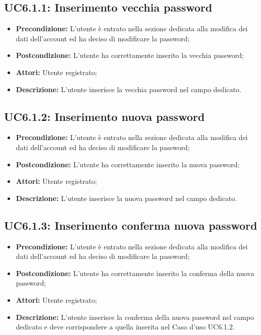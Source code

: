 \subsection{ UC6.1.1: Inserimento vecchia password}

\begin{itemize}
	\item \textbf{Precondizione:} L’utente è entrato nella sezione dedicata alla modifica dei dati dell’account ed ha deciso di modificare la password;
	\item \textbf{Postcondizione:} L’utente ha correttamente inserito la vecchia password;
	\item \textbf{Attori:} Utente registrato;
	\item \textbf{Descrizione:} L’utente inserisce la vecchia password nel campo dedicato.
\end{itemize}
\subsection{ UC6.1.2: Inserimento nuova password}

\begin{itemize}
	\item \textbf{Precondizione:} L’utente è entrato nella sezione dedicata alla modifica dei dati dell’account ed ha deciso di modificare la password;
	\item \textbf{Postcondizione:}  L’utente ha correttamente inserito la nuova password;
	\item \textbf{Attori:} Utente registrato;
	\item \textbf{Descrizione:} L’utente inserisce la nuova password nel campo dedicato.
\end{itemize}
\subsection{ UC6.1.3: Inserimento conferma nuova password}

\begin{itemize}
	\item \textbf{Precondizione:} L’utente è entrato nella sezione dedicata alla modifica dei dati dell’account ed ha deciso di modificare la password;
	\item \textbf{Postcondizione:} L’utente ha correttamente inserito la conferma della nuova password;
	\item \textbf{Attori:} Utente registrato;
	\item \textbf{Descrizione:} L’utente inserisce la conferma della nuova password nel campo dedicato e deve corrispondere a quella inserita nel Caso d’uso UC6.1.2.
\end{itemize}

